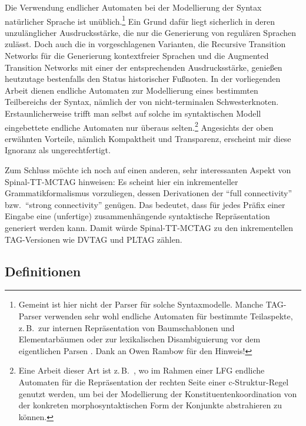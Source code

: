 Die Verwendung endlicher Automaten bei der Modellierung der Syntax natürlicher Sprache ist unüblich.\footnote{Gemeint ist hier nicht der Parser für solche Syntaxmodelle. Manche TAG-Parser verwenden sehr wohl endliche Automaten für bestimmte Teilaspekte, z.\,B.\ zur internen Repräsentation von Baumschablonen und Elementarbäumen \citep{Nasr:Rambow:04} oder zur lexikalischen Disambiguierung vor dem eigentlichen Parsen \citep{Gardent:etal:14}. Dank an Owen Rambow für den Hinweis!} Ein Grund dafür liegt sicherlich in deren unzulänglicher Ausdrucksstärke, die nur die Generierung von regulären Sprachen zulässt. Doch auch die in \cite{Woods:70} vorgeschlagenen Varianten, die Recursive Transition Networks für die Generierung kontextfreier Sprachen und die Augmented Transition Networks mit einer der  entsprechenden Ausdrucksstärke, genie\ss en heutzutage bestenfalls den Status historischer Fu\ss noten. In der vorliegenden Arbeit dienen endliche Automaten zur Modellierung eines bestimmten Teilbereichs der Syntax, nämlich der  von nicht-terminalen Schwesterknoten. Erstaunlicherweise trifft man selbst auf solche im syntaktischen Modell eingebettete endliche Automaten nur überaus selten.\footnote{Eine Arbeit dieser Art ist z.\,B.\ \cite{Maxwell:Manning:96}, wo im Rahmen einer LFG endliche Automaten für die Repräsentation der rechten Seite einer c-Struktur-Regel genutzt werden, um bei der Modellierung der Konstituentenkoordination von der konkreten morphosyntaktischen Form der Konjunkte abstrahieren zu können.} Angesichts der oben erwähnten Vorteile, nämlich Kompaktheit und Transparenz, erscheint mir diese Ignoranz als ungerechtfertigt.

Zum Schluss möchte ich noch auf einen anderen, sehr interessanten Aspekt von Spinal-TT-MCTAG hinweisen: Es scheint hier ein inkrementeller Grammatikformalismus vorzuliegen, dessen Derivationen der "`full connectivity"' \citep{Sturt:Lombardo:05} bzw.\ "`strong connectivity"' \citep{Stabler:94} genügen. Das bedeutet, dass für jedes Präfix einer Eingabe eine (unfertige) zusammenhängende syntaktische Repräsentation generiert werden kann. Damit würde Spinal-TT-MCTAG zu den inkrementellen TAG-Versionen wie DVTAG \citep{Mazzei:etal:07} und PLTAG \citep{Demberg:Keller:08, Demberg:10} zählen. 


\subsection{Definitionen}

